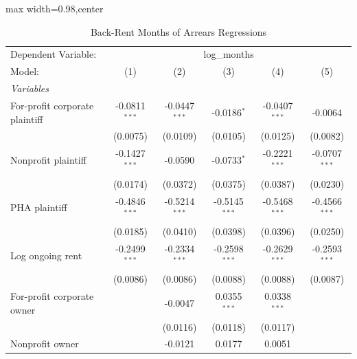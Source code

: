 
\begin{table}[htbp]
   \caption{\label{tab:backrent_months} Back-Rent Months of Arrears Regressions}
   \centering
   \scriptsize
   \begin{adjustbox}{max width=0.98\textwidth,center}
      \begin{tabular}{lccccc}
         \tabularnewline \midrule \midrule
         Dependent Variable: & \multicolumn{5}{c}{log\_months}\\
         Model:                                     & (1)             & (2)             & (3)             & (4)             & (5)\\  
         \midrule
         \emph{Variables}\\
         For-profit corporate plaintiff             & -0.0811$^{***}$ & -0.0447$^{***}$ & -0.0186$^{*}$   & -0.0407$^{***}$ & -0.0064\\   
                                                    & (0.0075)        & (0.0109)        & (0.0105)        & (0.0125)        & (0.0082)\\   
         Nonprofit plaintiff                        & -0.1427$^{***}$ & -0.0590         & -0.0733$^{*}$   & -0.2221$^{***}$ & -0.0707$^{***}$\\   
                                                    & (0.0174)        & (0.0372)        & (0.0375)        & (0.0387)        & (0.0230)\\   
         PHA plaintiff                              & -0.4846$^{***}$ & -0.5214$^{***}$ & -0.5145$^{***}$ & -0.5468$^{***}$ & -0.4566$^{***}$\\   
                                                    & (0.0185)        & (0.0410)        & (0.0398)        & (0.0396)        & (0.0250)\\   
         Log ongoing rent                           & -0.2499$^{***}$ & -0.2334$^{***}$ & -0.2598$^{***}$ & -0.2629$^{***}$ & -0.2593$^{***}$\\   
                                                    & (0.0086)        & (0.0086)        & (0.0088)        & (0.0088)        & (0.0087)\\   
         For-profit corporate owner                 &                 & -0.0047         & 0.0355$^{***}$  & 0.0338$^{***}$  &   \\   
                                                    &                 & (0.0116)        & (0.0118)        & (0.0117)        &   \\   
         Nonprofit owner                            &                 & -0.0121         & 0.0177          & 0.0051          &   \\   

\end{tabular}
\end{adjustbox}
\end{table}

